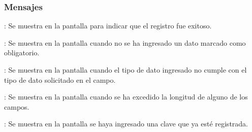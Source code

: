 \subsubsection{Mensajes}

\begin{Citemize}
	\item {}: Se muestra en la pantalla  para indicar que el registro fue exitoso.
	\item {}: Se muestra en la pantalla  cuando no se ha ingresado un dato marcado como obligatorio.
	\item {}: Se muestra en la pantalla  cuando el tipo de dato ingresado no cumple con el tipo de dato solicitado en el campo.
	\item {}: Se muestra en la pantalla  cuando se ha excedido la longitud de alguno de los campos.
	\item {}: Se muestra en la pantalla  se haya ingresado una clave que ya esté registrada.
\end{Citemize}
